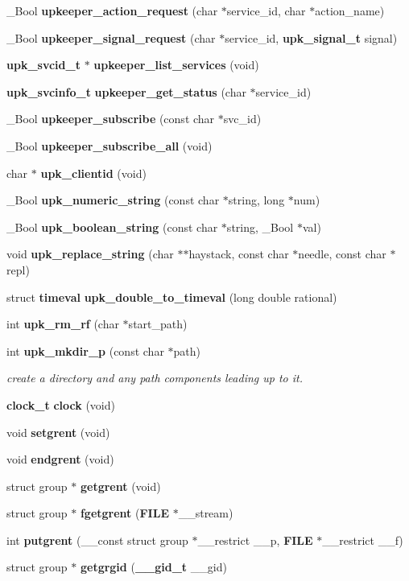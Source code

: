\begin{DoxyCompactItemize}
\item 
\_\-Bool {\bf upkeeper\_\-action\_\-request} (char $\ast$service\_\-id, char $\ast$action\_\-name)
\item 
\_\-Bool {\bf upkeeper\_\-signal\_\-request} (char $\ast$service\_\-id, {\bf upk\_\-signal\_\-t} signal)
\item 
{\bf upk\_\-svcid\_\-t} $\ast$ {\bf upkeeper\_\-list\_\-services} (void)
\item 
{\bf upk\_\-svcinfo\_\-t} {\bf upkeeper\_\-get\_\-status} (char $\ast$service\_\-id)
\item 
\_\-Bool {\bf upkeeper\_\-subscribe} (const char $\ast$svc\_\-id)
\item 
\_\-Bool {\bf upkeeper\_\-subscribe\_\-all} (void)
\item 
char $\ast$ {\bf upk\_\-clientid} (void)
\item 
\_\-Bool {\bf upk\_\-numeric\_\-string} (const char $\ast$string, long $\ast$num)
\item 
\_\-Bool {\bf upk\_\-boolean\_\-string} (const char $\ast$string, \_\-Bool $\ast$val)
\item 
void {\bf upk\_\-replace\_\-string} (char $\ast$$\ast$haystack, const char $\ast$needle, const char $\ast$repl)
\item 
struct {\bf timeval} {\bf upk\_\-double\_\-to\_\-timeval} (long double rational)
\item 
int {\bf upk\_\-rm\_\-rf} (char $\ast$start\_\-path)
\item 
int {\bf upk\_\-mkdir\_\-p} (const char $\ast$path)
\begin{DoxyCompactList}\small\item\em create a directory and any path components leading up to it. \end{DoxyCompactList}\item 
{\bf clock\_\-t} {\bf clock} (void)
\item 
void {\bf setgrent} (void)
\item 
void {\bf endgrent} (void)
\item 
struct group $\ast$ {\bf getgrent} (void)
\item 
struct group $\ast$ {\bf fgetgrent} ({\bf FILE} $\ast$\_\-\_\-stream)
\item 
int {\bf putgrent} (\_\-\_\-const struct group $\ast$\_\-\_\-restrict \_\-\_\-p, {\bf FILE} $\ast$\_\-\_\-restrict \_\-\_\-f)
\item 
struct group $\ast$ {\bf getgrgid} ({\bf \_\-\_\-gid\_\-t} \_\-\_\-gid)
\item 
$$
\end{DoxyCompactItemize}
